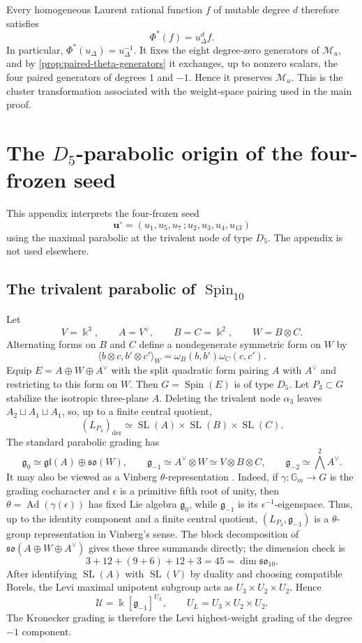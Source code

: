 \documentclass[11pt,reqno]{amsart}
\numberwithin{equation}{section}
\theoremstyle{remark}
\newcommand{\kk}{\Bbbk}
\newcommand{\UR}{\mathscr U}
\newcommand{\Mu}{\mathcal M_u}
\newcommand{\udisc}{u_{\Delta}}
\newcommand{\SL}{\operatorname{SL}}
\begin{document}
Every homogeneous Laurent rational function $f$ of mutable degree $d$
therefore satisfies
\[ \Phi^*(f)=\udisc^d f. \]
In particular, $\Phi^*(\udisc)=\udisc^{-1}$.  It fixes the eight
degree-zero generators of $\Mu$, and by
\cref{prop:paired-theta-generators} it exchanges, up to nonzero scalars, the
four paired generators of degrees $1$ and $-1$.  Hence it preserves
$\Mu$.  This is the cluster transformation associated with the weight-space pairing
used in the main proof.


\section{The \texorpdfstring{$D_5$}{D5}-parabolic origin of the four-frozen seed}
\label{app:D5-parabolic}

This appendix interprets the four-frozen seed
\[ \mathbf u^\circ=(u_1,u_5,u_7\,;u_2,u_3,u_4,u_{13}) \]
using the maximal parabolic at the trivalent node of type $D_5$.  The
appendix is not used elsewhere.

\subsection{The trivalent parabolic of
\texorpdfstring{$\operatorname{Spin}_{10}$}{Spin(10)}}

Let
\[ V=\kk^3,\qquad A=V^\vee,\qquad B=C=\kk^2, \qquad W=B\otimes C. \]
Alternating forms on $B$ and $C$ define a nondegenerate symmetric form
on $W$ by
\[ \langle b\otimes c,b'\otimes c'\rangle_W =\omega_B(b,b')\omega_C(c,c'). \]
Equip $E=A\oplus W\oplus A^\vee$ with the split quadratic form pairing
$A$ with $A^\vee$ and restricting to this form on $W$.  Then
$G=\operatorname{Spin}(E)$ is of type $D_5$.  Let $P_3\subset G$
stabilize the isotropic three-plane $A$.  Deleting the trivalent node
$\alpha_3$ leaves $A_2\sqcup A_1\sqcup A_1$, so, up to a finite
central quotient,
\[ (L_{P_3})_{\mathrm{der}} \simeq\SL(A)\times\SL(B)\times\SL(C). \]
The standard parabolic grading \cite[Chapter~3]{CapSlovak} has
\[ \mathfrak g_0\simeq\mathfrak{gl}(A)\oplus\mathfrak{so}(W),\qquad \mathfrak g_{-1}\simeq A^\vee\otimes W\simeq V\otimes B\otimes C,\qquad \mathfrak g_{-2}\simeq\bigwedge^2A^\vee. \]
It may also be viewed as a Vinberg $\theta$-representation
\cite{VinbergTheta}.  Indeed, if $\gamma:\mathbb G_m\to G$ is the
grading cocharacter and $\epsilon$ is a primitive fifth root of unity,
then $\theta=\operatorname{Ad}(\gamma(\epsilon))$ has fixed Lie algebra
$\mathfrak g_0$, while $\mathfrak g_{-1}$ is its
$\epsilon^{-1}$-eigenspace.  Thus, up to the identity component and a
finite central quotient, $(L_{P_3},\mathfrak g_{-1})$ is a
$\theta$-group representation in Vinberg's sense.
The block decomposition of $\mathfrak{so}(A\oplus W\oplus A^\vee)$ gives
these three summands directly; the dimension check is
\[ 3+12+(9+6)+12+3=45=\dim\mathfrak{so}_{10}. \]
After identifying $\SL(A)$ with $\SL(V)$ by duality and choosing
compatible Borels, the Levi maximal unipotent subgroup acts as
$U_3\times U_2\times U_2$.  Hence
\[ \UR=\kk[\mathfrak g_{-1}]^{U_L},\qquad U_L=U_3\times U_2\times U_2. \]
The Kronecker grading is therefore the Levi highest-weight grading of the
degree $-1$ component.
\end{document}
